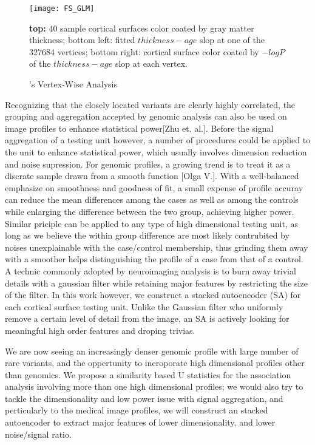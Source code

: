 \begin{figure}[h]
\texttt{[image: FS\_GLM]}
\caption[\FS's Vertex-Wise Analysis]{\FS's Vertex-Wise Analysis}
\label{fig:FS1}
\textbf{top:} 40 sample cortical surfaces color coated by gray matter thickness;
\textsf{bottom left:} fitted $thickness - age$ slop at one of the 327684 vertices;
\textsf{bottom right:} cortical surface color coated by $-log{P}$ of the $thickness - age$ slop at each vertex.
\end{figure}
Recognizing that the closely located variants are clearly highly correlated, the grouping and aggregation accepted by genomic analysis can also be used on image profiles to enhance statistical power[Zhu et. al.].
Before the signal aggregation of a testing unit however, a number of procedures could be applied to the unit to enhance statistical power, which usually involves dimension reduction and noise supression. For genomic profiles, a growing trend is to treat it as a discrate sample drawn from a smooth function [Olga V.]. With a well-balanced emphasize on smoothness and goodness of fit, a small expense of profile accuray can reduce the mean differences among the cases as well as among the controls while enlarging the difference between the two group, achieving higher power. Similar priciple can be applied to any type of high dimensional testing unit, as long as we believe the within group difference are most likely contrubited by noises unexplainable with the case/control membership, thus grinding them away with a smoother helps distinguishing the profile of a case from that of a control. A technic commonly adopted by neuroimaging analysis is to burn away trivial details with a gaussian filter while retaining major features by restricting the size of the filter\cite{VWA1, VWA2, VWA3, VWA4}. In this work however, we construct a stacked autoencoder (SA) for each cortical surface testing unit. Unlike the Gaussian filter who uniformly remove a certain level of detail from the image, an SA is actively looking for meaningful high order features and droping trivias.

We are now seeing an increasingly denser genomic profile with large number of rare variants, and the oppertunity to incroporate high dimensional profiles other than genomics. We propose a similarity based U statistics for the association analysis involving more than one high dimensional profiles; we would also try to tackle the dimensionality and low power issue with signal aggregation, and perticularly to the medical image profiles, we will construct an stacked autoencoder to extract major features of lower dimensionality, and lower noise/signal ratio.